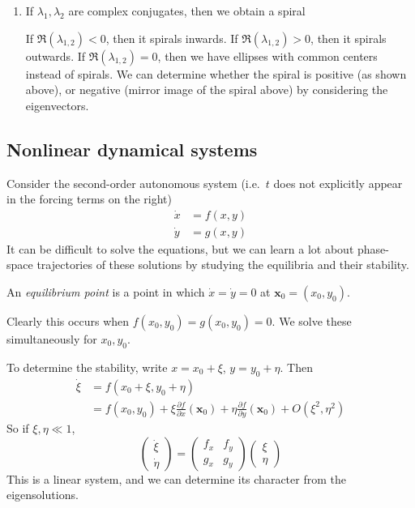 \documentclass[a4paper]{article}
\begin{document}
\begin{enumerate}
  \item If $\lambda_1, \lambda_2$ are complex conjugates, then we obtain a spiral
    \begin{center}
    \end{center}
    If $\Re (\lambda_{1, 2}) < 0$, then it spirals inwards. If $\Re (\lambda_{1, 2}) > 0$, then it spirals outwards. If $\Re (\lambda_{1, 2}) = 0$, then we have ellipses with common centers instead of spirals. We can determine whether the spiral is positive (as shown above), or negative (mirror image of the spiral above) by considering the eigenvectors.
\end{enumerate}

\subsection{Nonlinear dynamical systems}
Consider the second-order autonomous system (i.e.\ $t$ does not explicitly appear in the forcing terms on the right)
\begin{align*}
  \dot x &= f(x, y)\\
  \dot y &= g(x, y)
\end{align*}
It can be difficult to solve the equations, but we can learn a lot about phase-space trajectories of these solutions by studying the equilibria and their stability.

\begin{defi}
  An \emph{equilibrium point} is a point in which $\dot x = \dot y = 0$ at $\mathbf{x}_0 = (x_0, y_0)$.
\end{defi}

Clearly this occurs when $f(x_0, y_0) = g(x_0, y_0) = 0$. We solve these simultaneously for $x_0, y_0$.

To determine the stability, write $x = x_0 + \xi$, $y = y_0 + \eta$. Then
\begin{align*}
  \dot \xi &= f(x_0 + \xi, y_0 + \eta)\\
  &= f(x_0, y_0)+ \xi \frac{\partial f}{\partial x}(\mathbf{x}_0) + \eta \frac{\partial f}{\partial y}(\mathbf{x}_0) + O(\xi^2, \eta^2)
\end{align*}
So if $\xi, \eta \ll 1$,
\[
  \begin{pmatrix}
    \dot \xi\\\dot \eta
  \end{pmatrix} =
  \begin{pmatrix}
    f_x & f_y\\
    g_x & g_y
  \end{pmatrix}
  \begin{pmatrix}
    \xi\\\eta
  \end{pmatrix}
\]
This is a linear system, and we can determine its character from the eigensolutions.
\end{document}
